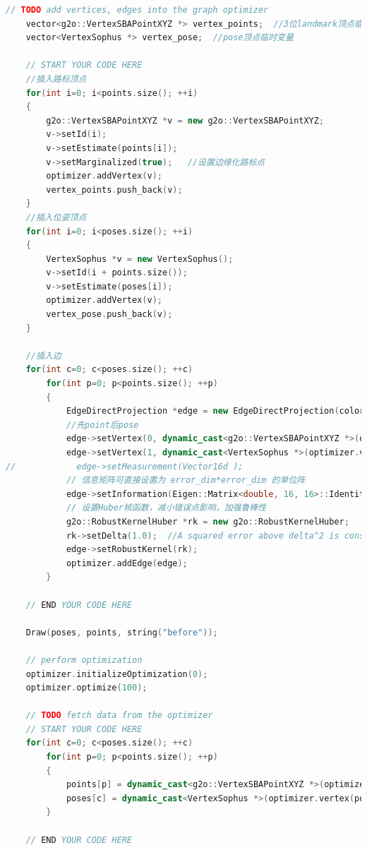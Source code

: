 \documentclass[40pt,a4paper，UTF8]{ctexart}
\numberwithin{equation}{section}
\begin{document}
\begin{lstlisting}[language=C++, caption=Direct\_BA.cpp]
    // TODO add vertices, edges into the graph optimizer
    vector<g2o::VertexSBAPointXYZ *> vertex_points;  //3位landmark顶点临时变量
    vector<VertexSophus *> vertex_pose;  //pose顶点临时变量

    // START YOUR CODE HERE
    //插入路标顶点
    for(int i=0; i<points.size(); ++i)
    {
        g2o::VertexSBAPointXYZ *v = new g2o::VertexSBAPointXYZ;
        v->setId(i);
        v->setEstimate(points[i]);
        v->setMarginalized(true);   //设置边缘化路标点
        optimizer.addVertex(v);
        vertex_points.push_back(v);
    }
    //插入位姿顶点
    for(int i=0; i<poses.size(); ++i)
    {
        VertexSophus *v = new VertexSophus();
        v->setId(i + points.size());
        v->setEstimate(poses[i]);
        optimizer.addVertex(v);
        vertex_pose.push_back(v);
    }

    //插入边
    for(int c=0; c<poses.size(); ++c)
        for(int p=0; p<points.size(); ++p)
        {
            EdgeDirectProjection *edge = new EdgeDirectProjection(color[p], images[c]);  //每个图中的每个点都插入到优化图中，都有一条边
            //先point后pose
            edge->setVertex(0, dynamic_cast<g2o::VertexSBAPointXYZ *>(optimizer.vertex(p)));
            edge->setVertex(1, dynamic_cast<VertexSophus *>(optimizer.vertex(points.size()+c)));
//            edge->setMeasurement(Vector16d );
            // 信息矩阵可直接设置为 error_dim*error_dim 的单位阵
            edge->setInformation(Eigen::Matrix<double, 16, 16>::Identity());
            // 设置Huber核函数，减小错误点影响，加强鲁棒性
            g2o::RobustKernelHuber *rk = new g2o::RobustKernelHuber;
            rk->setDelta(1.0);  //A squared error above delta^2 is considered as outlier in the data
            edge->setRobustKernel(rk);
            optimizer.addEdge(edge);
        }

    // END YOUR CODE HERE

    Draw(poses, points, string("before"));

    // perform optimization
    optimizer.initializeOptimization(0);
    optimizer.optimize(100);

    // TODO fetch data from the optimizer
    // START YOUR CODE HERE
    for(int c=0; c<poses.size(); ++c)
        for(int p=0; p<points.size(); ++p)
        {
            points[p] = dynamic_cast<g2o::VertexSBAPointXYZ *>(optimizer.vertex(p))->estimate();
            poses[c] = dynamic_cast<VertexSophus *>(optimizer.vertex(points.size()+c))->estimate();
        }

    // END YOUR CODE HERE


\end{lstlisting}
\end{document}
